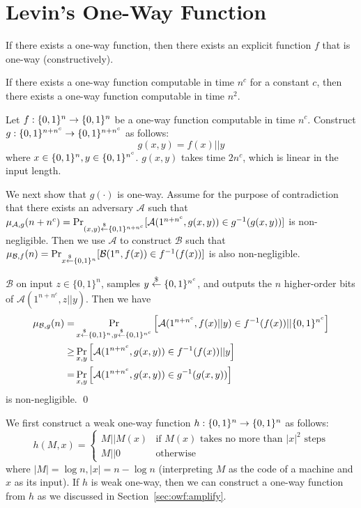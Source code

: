\section{Levin's One-Way Function}
\begin{theorem}\label{thm:levin}
If there exists a one-way function, then there exists an explicit function $f$ that is one-way  (constructively).
\end{theorem}

\begin{lemma}\label{lem:n2owf}
If there exists a one-way function computable in time $n^c$ for a constant $c$, then there exists a one-way function computable in time $n^2$.
\end{lemma}
\proof
Let $f: \{0,1\}^{n} \rightarrow \{0,1\}^{n}$ be a one-way function computable in time $n^c$.
Construct $g: \{0,1\}^{n+n^c} \rightarrow \{0,1\}^{n+n^c}$ as follows:
$$g(x,y) = f(x) || y$$
where $x \in \{0,1\}^{n}, y \in \{0,1\}^{n^c}$.
$g(x,y)$ takes time $2n^c$, which is linear in the input length.

We next show that $g(\cdot)$ is one-way.
Assume for the purpose of contradiction that there exists an adversary $\mathcal{A}$ such that $\mu_{\mathcal{A},g}(n+n^c) = \Pr_{(x,y) \stackrel{\$}{\leftarrow} \{0,1\}^{n+n^c}}[ \mathcal{A}(1^{n+n^c}, g(x,y)) \in g^{-1}(g(x,y))]$ is non-negligible. Then we use $\mathcal{A}$ to construct $\mathcal{B}$ such that $\mu_{\mathcal{B},f}(n) = \Pr_{x \stackrel{\$}{\leftarrow} \{0,1\}^{n}}[ \mathcal{B}(1^n, f(x)) \in f^{-1}(f(x))]$ is also non-negligible.

$\mathcal{B}$ on input $z \in\{0,1\}^n$, samples $y \stackrel{\$}{\leftarrow} \{0,1\}^{n^c}$, and outputs the $n$ higher-order bits of  $\mathcal{A}(1^{n+n^c}, z||y)$. Then we have
\begin{align*}
\mu_{\mathcal{B},g}(n) =& \Pr_{x \stackrel{\$}{\leftarrow} \{0,1\}^{n}, y \stackrel{\$}{\leftarrow} \{0,1\}^{n^c}}\left[\mathcal{A}(1^{n+n^c}, f(x) || y) \in f^{-1}(f(x)) || \{0,1\}^{n^c}\right]\\
\geq&\Pr_{x,y}\left[\mathcal{A}(1^{n+n^c}, g(x,y)) \in f^{-1}(f(x)) || y\right]\\
=& \Pr_{x,y}\left[\mathcal{A}(1^{n+n^c}, g(x,y)) \in g^{-1}(g(x,y))\right]
\end{align*}
is non-negligible.
\qed

\bigskip
{}
We first construct a weak one-way function $h: \{0,1\}^{n} \rightarrow \{0,1\}^{n}$ as follows:
$$
h(M,x) = \left\{
\begin{array}{ll}
M || M(x) & \text{if $M(x)$ takes no more than $|x|^2$ steps} \\
M || 0 & \text{otherwise}
\end{array}
\right.
$$
where $|M| = \log n, |x| = n - \log n$ (interpreting $M$ as the code of a machine  and $x$ as its input).
If $h$ is weak one-way, then we can construct a one-way function from $h$ as we discussed in Section~\ref{sec:owf:amplify}.

